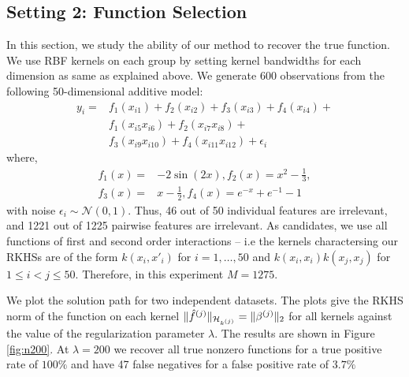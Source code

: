 \insertFigCompToy

\insertFigSolnPath

% 

\subsection{Setting 2: Function Selection}

In this section, we study the ability of our method to recover the true function.
We use RBF kernels on each group by setting kernel bandwidths
for each dimension as same as explained above.
We generate $600$ observations from the following
50-dimensional additive model:
\begingroup
\allowdisplaybreaks
\begin{align*}
	y_i =& f_1(x_{i1}) + f_2(x_{i2}) + f_3(x_{i3}) + f_4(x_{i4}) + \\
&f_1(x_{i5}x_{i6}) + f_2(x_{i7}x_{i8}) + \\
&f_3(x_{i9}x_{i10}) + f_4(x_{i11}x_{i12}) + \epsilon_i 
\end{align*}
\endgroup
where,
\begin{align*}
f_1(x) =& -2\sin(2x), f_2(x) = x^2 - \frac{1}{3}, \\
f_3(x)=& x-\frac{1}{2}, f_4(x) = e^{-x} + e^{-1} - 1
\end{align*}
with noise $\epsilon_i \sim \mathcal{N}(0,1)$.
Thus, 46 out of 50 individual features are irrelevant, and
1221 out of 1225 pairwise features are irrelevant.
As candidates, we use all functions of first and second order interactions --
i.e the kernels charactersing our RKHSs are of the form
$k(x_i, x'_i)$ for $i=1,\dots,50$ and $k(x_i,x_i)k(x_j,x_j)$ for
$1\leq i < j \leq 50$. Therefore, in this experiment $M = 1275$.

We plot the solution path for two independent datasets. The plots give the RKHS
norm of the function on each kernel $\|\hat{f}^{(j)}\|_{{{\mathcal{H}_{k^{(j)}}}}} = \|{\beta^{(j)}}\|_2$
for all kernels against the value of the regularization parameter $\lambda$.
The results are shown in Figure \ref{fig:n200}. 
At $\lambda=200$ we recover all true nonzero functions for a true positive rate
of $100\%$ and have 47 false negatives for a false positive rate of $3.7\%$

